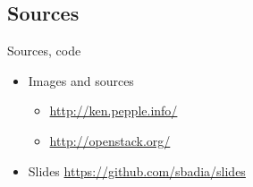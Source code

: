 \subsection{Sources}
\begin{frame}{Sources, code}
\begin{itemize}
  \item Images and sources
    \medskip
    \begin{itemize}
      \item \url{http://ken.pepple.info/}
    \medskip
      \item \url{http://openstack.org/}
    \medskip
    \end{itemize}
  \item Slides \url{https://github.com/sbadia/slides}
\end{itemize}
\end{frame}
